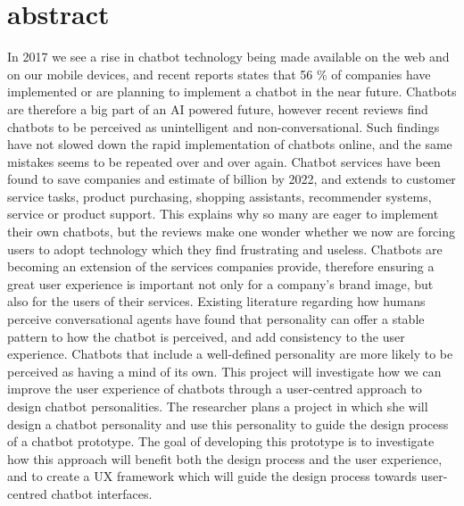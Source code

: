 \chapter*{abstract}

In 2017 we see a rise in chatbot technology being made available on the web and on our mobile devices, and recent reports states that 56 \% of companies have implemented or are planning to implement a chatbot in the near future. Chatbots are therefore a big part of an AI powered future, however recent reviews find chatbots to be perceived as unintelligent and non-conversational. Such findings have not slowed down the rapid implementation of chatbots online, and the same mistakes seems to be repeated over and over again. Chatbot services have been found to save companies and estimate of  billion by 2022, and extends to customer service tasks, product purchasing, shopping assistants, recommender systems, service or product support. This explains why so many are eager to implement their own chatbots, but the reviews make one wonder whether we now are forcing users to adopt technology which they find frustrating and useless. Chatbots are becoming an extension of the services companies provide, therefore ensuring a great user experience is important not only for a company's brand image, but also for the users of their services. Existing literature regarding how humans perceive conversational agents have found that personality can offer a stable pattern to how the chatbot is perceived, and add consistency to the user experience. Chatbots that include a well-defined personality are more likely to be perceived as having a mind of its own. This project will investigate how we can improve the user experience of chatbots through a user-centred approach to design chatbot personalities. The researcher plans a project in which she will design a chatbot personality and use this personality to guide the design process of a chatbot prototype. The goal of developing this prototype is to investigate how this approach will benefit both the design process and the user experience, and to create a UX framework which will guide the design process towards user-centred chatbot interfaces.

\hypersetup{pageanchor=false}